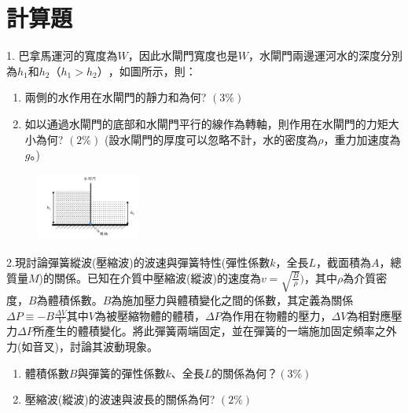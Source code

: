 \documentclass[cn,10pt,math=newtx]{elegantbook}
\begin{document}
\section{計算題}

\begin{example}
   1.	巴拿馬運河的寬度為$W$，因此水閘門寬度也是$W$，水閘門兩邊運河水的深度分別為$h_1$和$h_2 （ℎ_1 > ℎ_2）$，如圖所示，則：
   \begin{enumerate}[label=(\arabic*)] 
\item 兩側的水作用在水閘門的靜力和為何?  $( 3\% )$
\item 如以通過水閘門的底部和水閘門平行的線作為轉軸，則作用在水閘門的力矩大小為何?  $( 2\% )$
(設水閘門的厚度可以忽略不計，水的密度為$\rho$，重力加速度為$g$。)
\end{enumerate}

    \rightline{[成德高中教甄109]}
\end{example}
\begin{solution}
    
\end{solution}
\begin{figure}[htbp]
    \flushright
    \includegraphics[width=0.3\textwidth]{image/109成德41.png}
  \end{figure}
\newpage



\begin{example}
   	2.現討論彈簧縱波(壓縮波)的波速與彈簧特性(彈性係數$k$，全長$L$，截面積為$A$，總質量$M$)的關係。已知在介質中壓縮波(縱波)的速度為$v=\sqrt{\frac{B}{\rho}})$，其中$\rho$為介質密度，$B$為體積係數。$B$為施加壓力與體積變化之間的係數，其定義為關係$ \Delta P\equiv-B \frac{\Delta V}{V}$其中$V$為被壓縮物體的體積，$\Delta P$為作用在物體的壓力，$\Delta V$為相對應壓力$\Delta P$所產生的體積變化。將此彈簧兩端固定，並在彈簧的一端施加固定頻率之外力(如音叉)，討論其波動現象。
   	\begin{enumerate}[label=(\arabic*)] 
\item 體積係數$B$與彈簧的彈性係數$k$、全長$L$的關係為何？$( 3\% )$
\item 壓縮波(縱波)的波速與波長的關係為何?  $( 2\%)$
\end{enumerate}
    \rightline{[成德高中教甄109]}
\end{example}
\begin{solution}
    
\end{solution}
\end{document}
